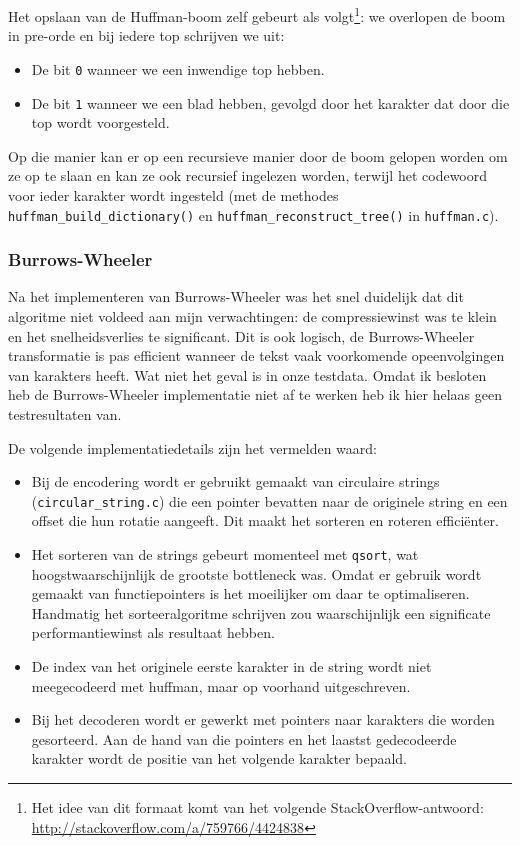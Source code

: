 \documentclass[a4paper]{article}
\begin{document}
Het opslaan van de Huffman-boom zelf gebeurt als volgt\footnote{Het idee van dit formaat komt van het volgende StackOverflow-antwoord: \url{http://stackoverflow.com/a/759766/4424838}}: we overlopen de boom in pre-orde en bij iedere top schrijven we uit:
\begin{itemize}[topsep=0pt]
    \item De bit \texttt{0} wanneer we een inwendige top hebben.
    \item De bit \texttt{1} wanneer we een blad hebben, gevolgd door het karakter dat door die top wordt voorgesteld.
\end{itemize}
Op die manier kan er op een recursieve manier door de boom gelopen worden om ze op te slaan en kan ze ook recursief ingelezen worden, terwijl het codewoord voor ieder karakter wordt ingesteld (met de methodes \texttt{huffman\_build\_dictionary()} en \texttt{huffman\_reconstruct\_tree()} in \texttt{huffman.c}).


\subsubsection{Burrows-Wheeler}

Na het implementeren van Burrows-Wheeler was het snel duidelijk dat dit algoritme niet voldeed aan mijn verwachtingen: de compressiewinst was te klein en het snelheidsverlies te significant. Dit is ook logisch, de Burrows-Wheeler transformatie is pas efficient wanneer de tekst vaak voorkomende opeenvolgingen van karakters heeft. Wat niet het geval is in onze testdata. Omdat ik besloten heb de Burrows-Wheeler implementatie niet af te werken heb ik hier helaas geen testresultaten van.

De volgende implementatiedetails zijn het vermelden waard:
\begin{itemize}
    \item Bij de encodering wordt er gebruikt gemaakt van circulaire strings (\texttt{circular\_string.c}) die een pointer bevatten naar de originele string en een offset die hun rotatie aangeeft. Dit maakt het sorteren en roteren efficiënter.
    \item Het sorteren van de strings gebeurt momenteel met \texttt{qsort}, wat hoogstwaarschijnlijk de grootste bottleneck was. Omdat er gebruik wordt gemaakt van functiepointers is het moeilijker om daar te optimaliseren. Handmatig het sorteeralgoritme schrijven zou waarschijnlijk een significate performantiewinst als resultaat hebben.
    \item De index van het originele eerste karakter in de string wordt niet meegecodeerd met huffman, maar op voorhand uitgeschreven.
    \item Bij het decoderen wordt er gewerkt met pointers naar karakters die worden gesorteerd. Aan de hand van die pointers en het laastst gedecodeerde karakter wordt de positie van het volgende karakter bepaald.
\end{itemize}
\end{document}
